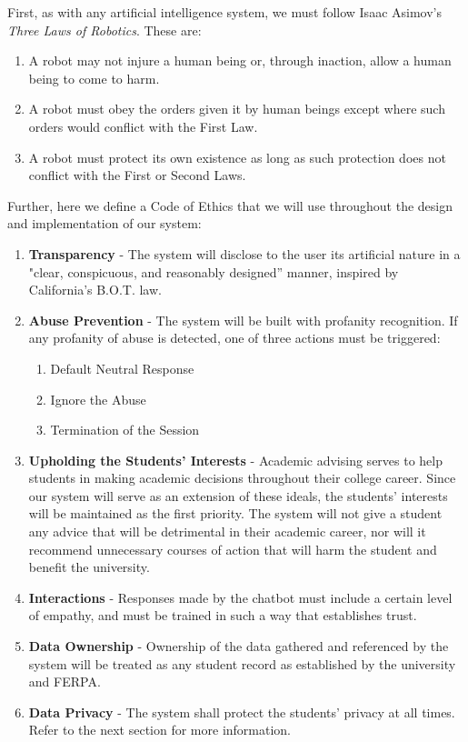 \documentclass[titlepage, 12pt]{article}
\begin{document}
First, as with any artificial intelligence system, we must follow Isaac Asimov’s \emph{Three Laws of Robotics}. These are:

\begin{enumerate}
    \item A robot may not injure a human being or, through inaction, allow a human being to come to harm.
    \item A robot must obey the orders given it by human beings except where such orders would conflict with the First Law.
    \item A robot must protect its own existence as long as such protection does not conflict with the First or Second Laws.
\end{enumerate}

Further, here we define a Code of Ethics that we will use throughout the design and implementation of our system:

\begin{enumerate}
    \item \textbf{Transparency} - The system will disclose to the user its artificial nature in a "clear, conspicuous, and reasonably designed” manner, inspired by California’s B.O.T. law.
    \item \textbf{Abuse Prevention} - The system will be built with profanity recognition. If any profanity of abuse is detected, one of three actions must be triggered:
    
    \begin{enumerate}[label=(\alph*)]
        \item Default Neutral Response 
        \item Ignore the Abuse
        \item Termination of the Session
    \end{enumerate}

    \item \textbf{Upholding the Students’ Interests} - Academic advising serves to help students in making academic decisions throughout their college career. Since our system will serve as an extension of these ideals, the students’ interests will be maintained as the first priority. The system will not give a student any advice that will be detrimental in their academic career, nor will it recommend unnecessary courses of action that will harm the student and benefit the university.
    \item \textbf{Interactions} - Responses made by the chatbot must include a certain level of empathy, and must be trained in such a way that establishes trust.
    \item \textbf{Data Ownership} - Ownership of the data gathered and referenced by the system will be treated as any student record as established by the university and FERPA.
    \item \textbf{Data Privacy} - The system shall protect the students’ privacy at all times. Refer to the next section for more information.
\end{enumerate}
\end{document}
